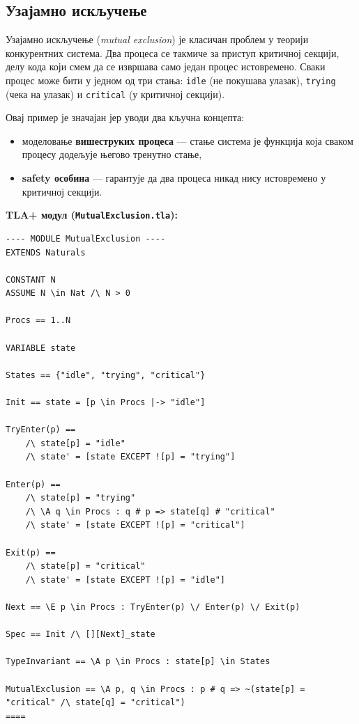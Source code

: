 \subsection{Узајамно искључење}
\begin{primer}
Узајамно искључење (\textit{mutual exclusion}) је класичан проблем у теорији конкурентних система.
Два процеса се такмиче за приступ критичној секцији, делу кода који смем да се извршава само један процес истовремено.
Сваки процес може бити у једном од три стања: \texttt{idle} (не покушава улазак), \texttt{trying} (чека на улазак) и \texttt{critical} (у критичној секцији).

Овај пример је значајан јер уводи два кључна концепта:
\begin{itemize}
    \item моделовање \textbf{вишеструких процеса} --- стање система је функција која сваком процесу додељује његово тренутно стање,
    \item \textbf{safety особина} --- гарантује да два процеса никад нису истовремено у критичној секцији.
\end{itemize}

\textbf{TLA+ модул (\texttt{MutualExclusion.tla}):}
\begin{lstlisting}
---- MODULE MutualExclusion ----
EXTENDS Naturals

CONSTANT N
ASSUME N \in Nat /\ N > 0

Procs == 1..N

VARIABLE state

States == {"idle", "trying", "critical"}

Init == state = [p \in Procs |-> "idle"]

TryEnter(p) ==
    /\ state[p] = "idle"
    /\ state' = [state EXCEPT ![p] = "trying"]

Enter(p) ==
    /\ state[p] = "trying"
    /\ \A q \in Procs : q # p => state[q] # "critical"
    /\ state' = [state EXCEPT ![p] = "critical"]

Exit(p) ==
    /\ state[p] = "critical"
    /\ state' = [state EXCEPT ![p] = "idle"]

Next == \E p \in Procs : TryEnter(p) \/ Enter(p) \/ Exit(p)

Spec == Init /\ [][Next]_state

TypeInvariant == \A p \in Procs : state[p] \in States

MutualExclusion == \A p, q \in Procs : p # q => ~(state[p] = "critical" /\ state[q] = "critical")
====
\end{lstlisting}


\end{primer}
